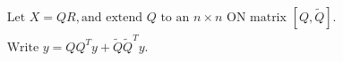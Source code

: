 \documentclass[convert={density=300,outext=.png}]{standalone}
\begin{document}
\begin{minipage}[t]{0.3\textwidth}
\begin{align*}
&\mbox{Let } X = QR, \mbox{and extend $Q$ to an $n\times n$ ON matrix } [Q, \tilde{Q}].\\
&\mbox{Write }y = Q Q^T y + \tilde{Q}\tilde{Q}^T y.
\end{align*}
\end{minipage}
\end{document}

